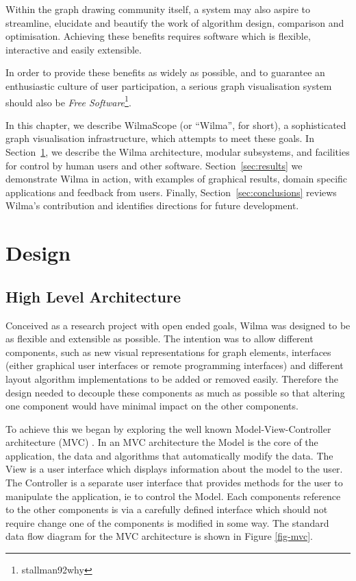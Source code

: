 \documentclass[runningheads]{cl2emult}
\begin{document}
Within the graph drawing community itself, a system may also aspire to 
streamline, elucidate and beautify the work of algorithm design, comparison
and optimisation.  Achieving these benefits requires software which is
flexible, interactive and easily extensible.

In order to provide these benefits as widely as possible, and to guarantee
an enthusiastic culture of user participation, a serious graph visualisation
system should also be {\em Free Software}\footnote{stallman92why}.

In this chapter, we describe WilmaScope (or ``Wilma'', for short), a
sophisticated graph visualisation infrastructure, which attempts to meet
these goals.  In Section~\ref{sec:design}, we describe the Wilma
architecture, modular subsystems, and facilities for control by human users
and other software.  Section~\ref{sec:results} we demonstrate Wilma in
action, with examples of graphical results, domain specific applications and
feedback from users.  Finally, Section~\ref{sec:conclusions} reviews Wilma's
contribution and identifies directions for future development.

\section{Design}\label{sec:design}
\subsection{High Level Architecture}
Conceived as a research project with open ended goals, Wilma was
designed to be as flexible and extensible as possible.  The intention
was to allow different components, such as new visual representations
for graph elements, interfaces (either graphical user interfaces or
remote programming interfaces) and different 
layout algorithm implementations to be added or removed easily.
Therefore the design needed to decouple these components as much as
possible so that altering one component would have minimal impact on
the other components.

To achieve this we began by exploring the well known Model-View-Controller
architecture (MVC) \cite{gamma94design}.  In an MVC architecture the Model is the core
of the application, the data and algorithms that automatically modify
the data.  The View is a user interface which displays information
about the model to the user.  The Controller is a separate user
interface that provides methods for the user to manipulate the
application, ie to control the Model.  Each components reference to
the other components is via a carefully defined interface which should
not require change one of the components is modified in some way.  The
standard data flow diagram for the MVC architecture is shown in Figure
\ref{fig-mvc}.
\end{document}
